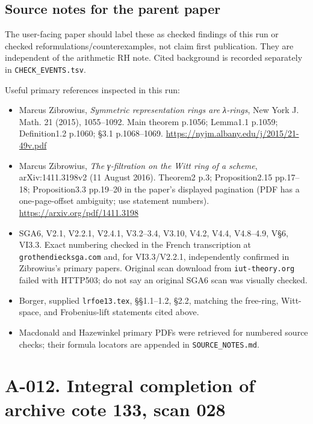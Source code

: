 \documentclass[
  10pt,
]{article}
\providecommand{\tightlist}{%
  \setlength{\itemsep}{0pt}\setlength{\parskip}{0pt}}
\providecommand{\tightlist}{\setlength{\itemsep}{0pt}\setlength{\parskip}{0pt}}
\begin{document}
\subsection{Source notes for the parent
paper}\label{source-notes-for-the-parent-paper}

The user-facing paper should label these as checked findings of this run
or checked reformulations/counterexamples, not claim first publication.
They are independent of the arithmetic RH note. Cited background is
recorded separately in \texttt{\small CHECK\_\allowbreak{}EVENTS.tsv}.

Useful primary references inspected in this run:

\begin{itemize}
\tightlist
\item
  Marcus Zibrowius, \emph{Symmetric representation rings are λ-rings},
  New York J. Math. 21 (2015), 1055--1092. Main theorem p.1056; Lemma1.1
  p.1059; Definition1.2 p.1060; §3.1 p.1068--1069.
  \url{https://nyjm.albany.edu/j/2015/21-49v.pdf}
\item
  Marcus Zibrowius, \emph{The γ-filtration on the Witt ring of a
  scheme}, arXiv:1411.3198v2 (11 August 2016). Theorem2 p.3;
  Proposition2.15 pp.17--18; Proposition3.3 pp.19--20 in the paper's
  displayed pagination (PDF has a one-page-offset ambiguity; use
  statement numbers). \url{https://arxiv.org/pdf/1411.3198}
\item
  SGA6, V2.1, V2.2.1, V2.4.1, V3.2--3.4, V3.10, V4.2, V4.4, V4.8--4.9,
  V§6, VI3.3. Exact numbering checked in the French transcription at
  \texttt{\small grothendiecksga.com} and, for VI3.3/V2.2.1,
  independently confirmed in Zibrowius's primary papers. Original scan
  download from \texttt{\small iut-\allowbreak{}theory.org} failed with
  HTTP503; do not say an original SGA6 scan was visually checked.
\item
  Borger, supplied \texttt{\small lrfoe13.tex}, §§1.1--1.2, §2.2,
  matching the free-ring, Witt-space, and Frobenius-lift statements
  cited above.
\item
  Macdonald and Hazewinkel primary PDFs were retrieved for numbered
  source checks; their formula locators are appended in
  \texttt{\small SOURCE\_\allowbreak{}NOTES.md}.
\end{itemize}

\section{A-012. Integral completion of archive cote 133, scan
028}\label{a-012.-integral-completion-of-archive-cote-133-scan-028}
\end{document}
